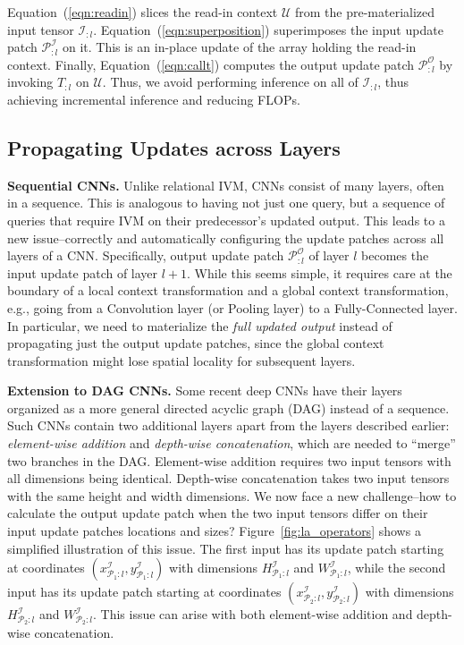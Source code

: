 Equation~(\ref{eqn:readin}) slices the read-in context $\mathcal{U}$ from the pre-materialized input tensor $\mathcal{I}_{:l}$. Equation~(\ref{eqn:superposition}) superimposes the input update patch $\mathcal{P}^\mathcal{I}_{:l}$ on it. This is an in-place update of the array holding the read-in context. Finally, Equation~(\ref{eqn:callt}) computes the output update patch $\mathcal{P}^{\mathcal{O}}_{:l}$ by invoking $T_{:l}$ on $\mathcal{U}$. Thus, we avoid performing inference on all of $\mathcal{I}_{:l}$, thus achieving incremental inference and reducing FLOPs.


\subsection{Propagating Updates across Layers}

\vspace{2mm}
\noindent \textbf{Sequential CNNs.} Unlike relational IVM, CNNs consist of many layers, often in a sequence. This is analogous to having not just one query, but a sequence of queries that require IVM on their predecessor's updated output. This leads to a new issue--correctly and automatically configuring the update patches across all layers of a CNN. Specifically, output update patch $\mathcal{P}^{\mathcal{O}}_{:l}$ of layer $l$ becomes the input update patch of layer $l+1$. While this seems simple, it requires care at the boundary of a local context transformation and a global context transformation, e.g., going from a Convolution layer (or Pooling layer) to a Fully-Connected layer. In particular, we need to materialize the \textit{full updated output} instead of propagating just the output update patches, since the global context transformation might lose spatial locality for subsequent layers.

\vspace{2mm}
\noindent \textbf{Extension to DAG CNNs.} Some recent deep CNNs have their layers organized as a more general directed acyclic graph (DAG) instead of a sequence. Such CNNs contain two additional layers apart from the layers described earlier: \textit{element-wise addition} and \textit{depth-wise concatenation}, which are needed to ``merge'' two branches in the DAG. Element-wise addition requires two input tensors with all dimensions being identical. Depth-wise concatenation takes two input tensors with the same height and width dimensions. We now face a new challenge--how to calculate the output update patch when the two input tensors differ on their input update patches locations and sizes? Figure~\ref{fig:la_operators} shows a simplified illustration of this issue. The first input has its update patch starting at coordinates $(x^\mathcal{I}_{\mathcal{P}_1:l},y^\mathcal{I}_{\mathcal{P}_1:l})$ with dimensions $H^\mathcal{I}_{\mathcal{P}_1:l}$ and $W^\mathcal{I}_{\mathcal{P}_1:l}$, while the second input has its update patch starting at coordinates $(x^\mathcal{I}_{\mathcal{P}_2:l},y^\mathcal{I}_{\mathcal{P}_2:l})$ with dimensions $H^\mathcal{I}_{\mathcal{P}_2:l}$ and $W^\mathcal{I}_{\mathcal{P}_2:l}$. This issue can arise with both element-wise addition and depth-wise concatenation. 

